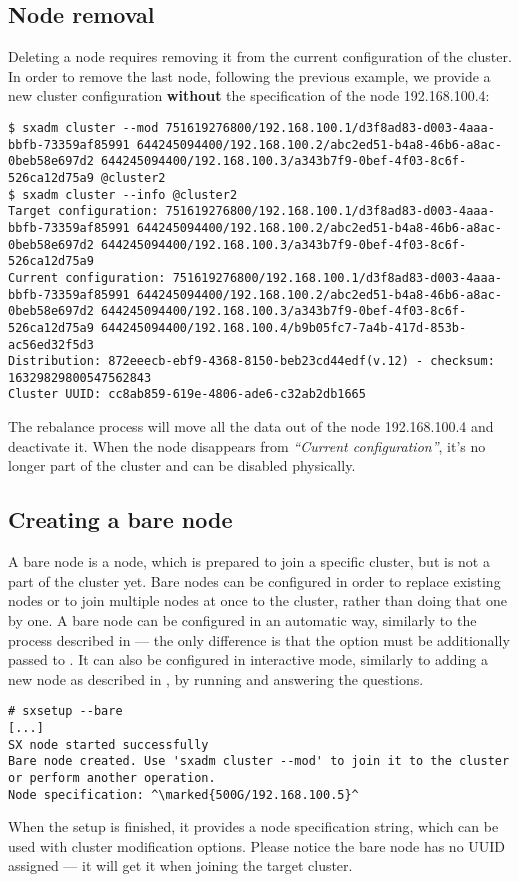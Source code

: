 \subsection{Node removal}
Deleting a node requires removing it from the current configuration of the
cluster. In order to remove the last node, following the previous example,
we provide a new cluster configuration \textbf{without} the specification
of the node 192.168.100.4:
\begin{lstlisting}
$ sxadm cluster --mod 751619276800/192.168.100.1/d3f8ad83-d003-4aaa-bbfb-73359af85991 644245094400/192.168.100.2/abc2ed51-b4a8-46b6-a8ac-0beb58e697d2 644245094400/192.168.100.3/a343b7f9-0bef-4f03-8c6f-526ca12d75a9 @cluster2
$ sxadm cluster --info @cluster2
Target configuration: 751619276800/192.168.100.1/d3f8ad83-d003-4aaa-bbfb-73359af85991 644245094400/192.168.100.2/abc2ed51-b4a8-46b6-a8ac-0beb58e697d2 644245094400/192.168.100.3/a343b7f9-0bef-4f03-8c6f-526ca12d75a9 
Current configuration: 751619276800/192.168.100.1/d3f8ad83-d003-4aaa-bbfb-73359af85991 644245094400/192.168.100.2/abc2ed51-b4a8-46b6-a8ac-0beb58e697d2 644245094400/192.168.100.3/a343b7f9-0bef-4f03-8c6f-526ca12d75a9 644245094400/192.168.100.4/b9b05fc7-7a4b-417d-853b-ac56ed32f5d3 
Distribution: 872eeecb-ebf9-4368-8150-beb23cd44edf(v.12) - checksum: 16329829800547562843
Cluster UUID: cc8ab859-619e-4806-ade6-c32ab2db1665
\end{lstlisting}
The rebalance process will move all the data out of the node 192.168.100.4 and
deactivate it. When the node disappears from \emph{``Current configuration''}, it's no
longer part of the cluster and can be disabled physically.

\subsection{Creating a bare node}
A bare node is a node, which is prepared to join a specific cluster, but is
not a part of the cluster yet. Bare nodes can be configured in order to
replace existing nodes or to join multiple nodes at once to the cluster,
rather than doing that one by one. A bare node can be configured in an
automatic way, similarly to the process described in 
--- the only difference is that the option  must be additionally
passed to . It can also be configured in interactive mode,
similarly to adding a new node as described in , by
running  and answering the questions.
\begin{lstlisting}
# sxsetup --bare
[...]
SX node started successfully
Bare node created. Use 'sxadm cluster --mod' to join it to the cluster
or perform another operation.
Node specification: ^\marked{500G/192.168.100.5}^
\end{lstlisting}
When the setup is finished, it provides a node specification string, which
can be used with cluster modification options. Please notice the bare node
has no UUID assigned --- it will get it when joining the target cluster.

